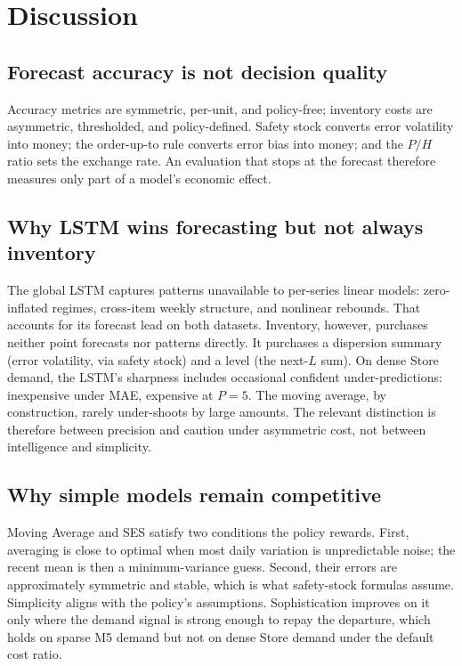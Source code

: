 \section{Discussion}
\label{sec:discussion}

\subsection{Forecast accuracy is not decision quality}
\label{sec:d-acc-dec}
Accuracy metrics are symmetric, per-unit, and policy-free; inventory costs
are asymmetric, thresholded, and policy-defined. Safety stock converts error
volatility into money; the order-up-to rule converts error bias into money;
and the $P/H$ ratio sets the exchange rate. An evaluation that stops at the
forecast therefore measures only part of a model's economic effect.

\subsection{Why LSTM wins forecasting but not always inventory}
\label{sec:d-lstm}
The global LSTM captures patterns unavailable to per-series linear models:
zero-inflated regimes, cross-item weekly structure, and nonlinear rebounds.
That accounts for its forecast lead on both datasets. Inventory, however,
purchases neither point forecasts nor patterns directly. It purchases a
dispersion summary (error volatility, via safety stock) and a level (the
next-$L$ sum). On dense Store demand, the LSTM's sharpness includes
occasional confident under-predictions: inexpensive under MAE, expensive at
$P=5$. The moving average, by construction, rarely under-shoots by large
amounts. The relevant distinction is therefore between precision and caution
under asymmetric cost, not between intelligence and simplicity.

\subsection{Why simple models remain competitive}
\label{sec:d-simple}
Moving Average and SES satisfy two conditions the policy rewards. First,
averaging is close to optimal when most daily variation is unpredictable
noise; the recent mean is then a minimum-variance guess. Second, their
errors are approximately symmetric and stable, which is what safety-stock
formulas assume. Simplicity aligns with the policy's assumptions.
Sophistication improves on it only where the demand signal is strong enough
to repay the departure, which holds on sparse M5 demand but not on dense
Store demand under the default cost ratio.

